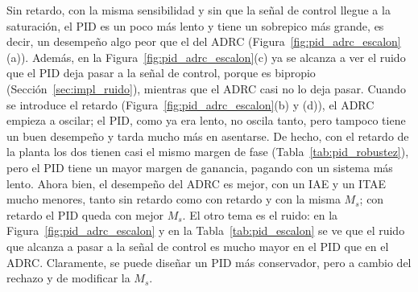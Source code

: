 \begin{table}[H]
\centering
\caption[Índices del escalón de consigna]{Índices del escalón de $2{,}0$ a
  $2{,}2$~mg/L sin retardo y con $\theta = 50$~s.}
\label{tab:pid_escalon}
\renewcommand{\arraystretch}{1.3}
\end{table}

Sin retardo, con la misma sensibilidad y sin que la señal de control llegue a la saturación, el PID
es un poco más lento y tiene un sobrepico más grande, es decir, un desempeño algo peor que el del ADRC
(Figura~\ref{fig:pid_adrc_escalon}(a)). Además, en la
Figura~\ref{fig:pid_adrc_escalon}(c) ya se alcanza a ver el ruido que el PID deja pasar a la
señal de control, porque es bipropio (Sección~\ref{sec:impl_ruido}), mientras que el ADRC casi no lo deja
pasar. Cuando se introduce el retardo (Figura~\ref{fig:pid_adrc_escalon}(b) y (d)), el ADRC empieza a oscilar; el
PID, como ya era lento, no oscila tanto, pero tampoco tiene un buen desempeño y tarda mucho más en
asentarse. De hecho, con el retardo de la planta los dos tienen casi el mismo margen de fase
(Tabla~\ref{tab:pid_robustez}), pero el PID tiene un mayor margen de ganancia, pagando con un sistema
más lento. Ahora bien, el desempeño del ADRC es mejor, con un IAE y un ITAE mucho menores, tanto sin
retardo como con retardo y con la misma $M_s$; con retardo el PID queda con mejor $M_s$. El otro tema es el ruido: en la Figura~\ref{fig:pid_adrc_escalon} y en la
Tabla~\ref{tab:pid_escalon} se ve que el ruido que alcanza a pasar a la señal de control es mucho mayor
en el PID que en el ADRC. Claramente, se puede diseñar un PID más conservador, pero a cambio del rechazo y de modificar la $M_s$.

